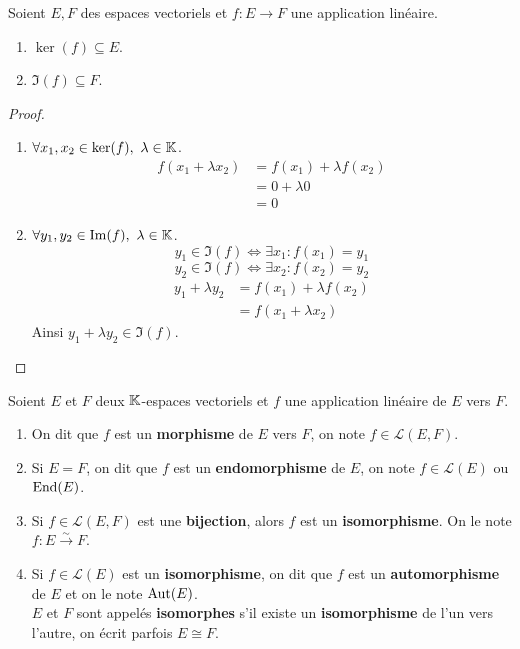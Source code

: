 \begin{theorem}
	Soient $E, F$ des espaces vectoriels et $f : E \to F$ une application linéaire.
	\begin{enumerate}
		\item $\ker(f) \subseteq E$.
		\item $\Im(f) \subseteq F$.
	\end{enumerate}
\end{theorem}

\begin{proof}
	\leavevmode 
	\begin{enumerate}
		\item $\forall x_1, x_2 \in \ker(f),\ \lambda \in \mathbb{K}$.
		\begin{align*}
			f(x_1 + \lambda x_2) &= f(x_1) + \lambda f(x_2) \\ 
								 &= 0 + \lambda 0 \\
								 &= 0
		\end{align*}
		\item $\forall y_1, y_2 \in \Im(f),\ \lambda \in \mathbb{K}$.
		\[ y_1 \in \Im(f) \iff \exists x_1 : f(x_1) = y_1 \]
		\[ y_2 \in \Im(f) \iff \exists x_2 : f(x_2) = y_2 \]
		\begin{align*}
			y_1 + \lambda y_2 &= f(x_1) + \lambda f(x_2) \\
			                  &= f(x_1 + \lambda x_2)
		\end{align*}
		Ainsi $y_1 + \lambda y_2 \in \Im(f)$.
	\end{enumerate}
\end{proof}

\begin{definition}
    \par \noindent Soient $E$ et $F$ deux $\mathbb{K}$-espaces vectoriels et $f$ une application linéaire de $E$ vers $F$.
    \begin{enumerate}
        \item On dit que $f$ est un \textbf{morphisme} de $E$ vers $F$, on note $f \in \mathcal{L}(E, F)$.
        \item Si $E = F$, on dit que $f$ est un \textbf{endomorphisme} de $E$, on note $f \in \mathcal{L}(E)$ ou $\operatorname{End}(E)$.
        \item Si $f \in \mathcal{L}(E, F)$ est une \textbf{bijection}, alors $f$ est un \textbf{isomorphisme}. On le note $f : E \overset{\sim}{\to} F$.
        \item Si $f \in \mathcal{L}(E)$ est un \textbf{isomorphisme}, on dit que $f$ est un \textbf{automorphisme} de $E$ et on le note $\operatorname{Aut}(E)$.
        \\
        $E$ et $F$ sont appelés \textbf{isomorphes} s'il existe un \textbf{isomorphisme} de l'un vers l'autre, on écrit parfois $E \cong F$.
    \end{enumerate}
\end{definition}


